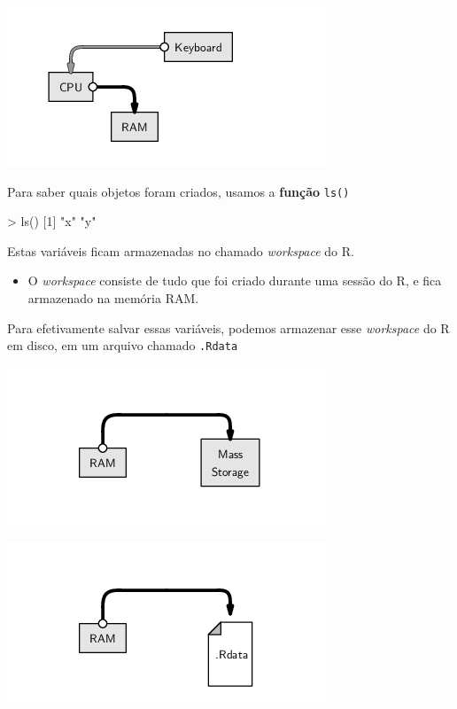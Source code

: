 \documentclass[
  10pt,
  a4paper]{book}
\newenvironment{Shaded}{\begin{snugshade}}{\end{snugshade}}
\newcommand{\DecValTok}[1]{\textcolor[rgb]{0.00,0.00,0.81}{#1}}
\newcommand{\FunctionTok}[1]{\textcolor[rgb]{0.00,0.00,0.00}{#1}}
\newcommand{\NormalTok}[1]{#1}
\newcommand{\SpecialCharTok}[1]{\textcolor[rgb]{0.00,0.00,0.00}{#1}}
\newcommand{\StringTok}[1]{\textcolor[rgb]{0.31,0.60,0.02}{#1}}
\providecommand{\tightlist}{%
  \setlength{\itemsep}{0pt}\setlength{\parskip}{0pt}}
\begin{document}
\begin{center}\includegraphics[width=0.5\linewidth]{img/script-assign} \end{center}

Para saber quais objetos foram criados, usamos a \textbf{função} \texttt{ls()}

\begin{Shaded}
\begin{Highlighting}[]
\SpecialCharTok{\textgreater{}} \FunctionTok{ls}\NormalTok{()}
\NormalTok{[}\DecValTok{1}\NormalTok{] }\StringTok{"x"} \StringTok{"y"}
\end{Highlighting}
\end{Shaded}

Estas variáveis ficam armazenadas no chamado \emph{workspace} do R.

\begin{itemize}
\tightlist
\item
  O \emph{workspace} consiste de tudo que foi criado durante uma sessão do R,
  e fica armazenado na memória RAM.
\end{itemize}

Para efetivamente salvar essas variáveis, podemos armazenar esse \emph{workspace}
do R em disco, em um arquivo chamado \texttt{.Rdata}

\begin{center}\includegraphics[width=0.5\linewidth]{img/script-workspace} \end{center}

\begin{center}\includegraphics[width=0.5\linewidth]{img/script-workspacedata} \end{center}
\end{document}
